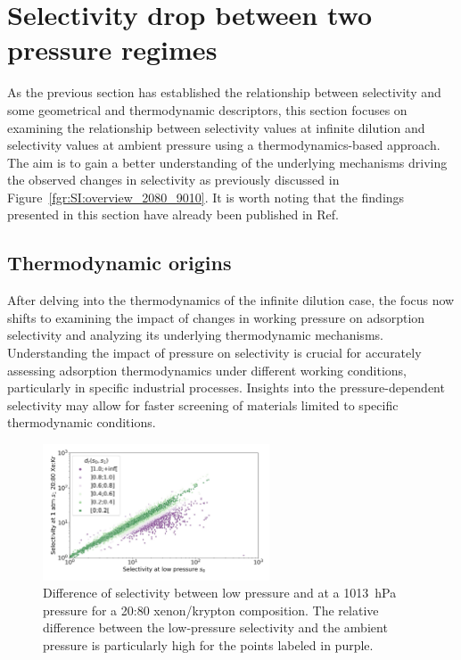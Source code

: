 \documentclass[main.tex]{subfiles}
\begin{document}
\section{Selectivity drop between two pressure regimes}

As the previous section has established the relationship between selectivity and some geometrical and thermodynamic descriptors, this section focuses on examining the relationship between selectivity values at infinite dilution and selectivity values at ambient pressure using a thermodynamics-based approach. The aim is to gain a better understanding of the underlying mechanisms driving the observed changes in selectivity as previously discussed in Figure~\ref{fgr:SI:overview_2080_9010}. It is worth noting that the findings presented in this section have already been published in Ref.~\cite{Ren_2021}

\subsection{Thermodynamic origins}\label{section:pressure}

After delving into the thermodynamics of the infinite dilution case, the focus now shifts to examining the impact of changes in working pressure on adsorption selectivity and analyzing its underlying thermodynamic mechanisms. Understanding the impact of pressure on selectivity is crucial for accurately assessing adsorption thermodynamics under different working conditions, particularly in specific industrial processes. Insights into the pressure-dependent selectivity may allow for faster screening of materials limited to specific thermodynamic conditions.

\begin{figure}[ht]
  \centering
    \includegraphics[width=0.6\textwidth]{figures/2-thermo/s_0_vs_s_2080_overview_log.jpg}
    \caption{Difference of selectivity between low pressure and at a \SI{1013}{\hecto\pascal} pressure for a 20:80 xenon/krypton composition. The relative difference between the low-pressure selectivity and the ambient pressure is particularly high for the points labeled in purple.}\label{fgr:overview}
\end{figure}
\end{document}
